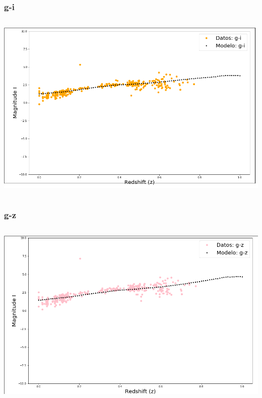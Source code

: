 \documentclass{beamer}
\begin{document}
\begin{frame}
\frametitle{g-i}
\begin{columns}
	\begin{column}{10cm}
		\includegraphics[width=\columnwidth]{gi.png} 
	\end{column}
\end{columns}
\end{frame}

\begin{frame}
\frametitle{g-z}
\begin{columns}
	\begin{column}{10cm}
		\includegraphics[width=\columnwidth]{gz.png} 
	\end{column}
\end{columns}
\end{frame}
\end{document}

